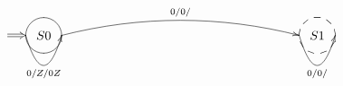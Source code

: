 \documentclass[12pt]{article}
\begin{document}
\[
\xy
(36,34)*{S0};
(112,34)*{S1};
(36,34)*\xycircle(5.00,5.00){}="S0";
(112,34)*\xycircle(5.00,5.00){--}="S1";
\ar@{=>}(26,34)*{}; (31,34)*{}
\ar@/_2pc/_{0/Z/0Z}(31,34)*{};(41,34)*{}
\ar@/^1pc/^{0/0/\\}(41,34)*{};(107,34)*{}
\ar@/_2pc/_{0/0/\\}(107,34)*{};(117,34)*{}

\endxy
\]
\end{document}
